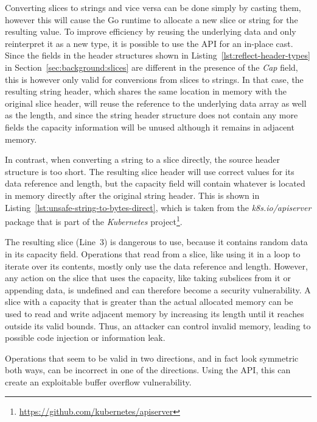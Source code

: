 Converting slices to strings and vice versa can be done simply by casting them, however this will cause the Go runtime
to allocate a new slice or string for the resulting value.
To improve efficiency by reusing the underlying data and only reinterpret it as a new type, it is possible to use the
\unsafe{} \acrshort{API} for an in-place cast.
Since the fields in the header structures shown in Listing~\ref{lst:reflect-header-types} in
Section~\ref{sec:background:slices} are different in the presence of the \textit{Cap} field, this is however only valid
for conversions from slices to strings.
In that case, the resulting string header, which shares the same location in memory with the original slice header, will
reuse the reference to the underlying data array as well as the length, and since the string header structure does not
contain any more fields the capacity information will be unused although it remains in adjacent memory.

In contrast, when converting a string to a slice directly, the source header structure is too short.
The resulting slice header will use correct values for its data reference and length, but the capacity field will
contain whatever is located in memory directly after the original string header.
This is shown in Listing~\ref{lst:unsafe-string-to-bytes-direct}, which is taken from the \textit{k8s.io/apiserver}
package that is part of the \textit{Kubernetes} project\footnote{\url{https://github.com/kubernetes/apiserver}}.



The resulting slice (Line~3) is dangerous to use, because it contains random data in its capacity field.
Operations that read from a slice, like using it in a loop to iterate over its contents, mostly only use the data
reference and length.
However, any action on the slice that uses the capacity, like taking subslices from it or appending data, is undefined
and can therefore become a security vulnerability.
A slice with a capacity that is greater than the actual allocated memory can be used to read and write adjacent memory
by increasing its length until it reaches outside its valid bounds.
Thus, an attacker can control invalid memory, leading to possible code injection or information leak.

\begin{insight}
    Operations that seem to be valid in two directions, and in fact look symmetric both ways, can be incorrect in one of
    the directions.
    Using the \unsafe{} \acrshort{API}, this can create an exploitable buffer overflow vulnerability.
\end{insight}


